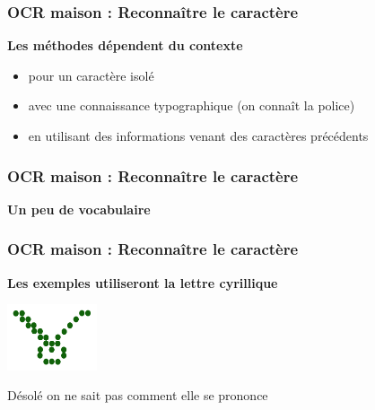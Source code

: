 \documentclass[xcolor=dvipsnames]{beamer}
\begin{document}
\begin{frame}
\frametitle{OCR maison : Reconnaître le caractère }
      \begin{alertblock}{}
            \begin{center}
                  \textbf{\Large Les méthodes dépendent du contexte}
            \end{center}
            \begin{itemize}
            \item pour un caractère isolé
            \item avec une connaissance typographique (on connaît la police)
            \item en utilisant des informations venant des caractères précédents
            \end{itemize}
      \end{alertblock}
\end{frame}


\begin{frame}
\frametitle{OCR maison : Reconnaître le caractère }
       
      \begin{alertblock}{}
            \begin{center}
                  \textbf{\Large Un peu de vocabulaire}
            \end{center}
      \end{alertblock}
\end{frame}

\begin{frame}
\frametitle{OCR maison : Reconnaître le caractère }
      \begin{alertblock}{}
    \begin{center}
              \textbf{\Large Les exemples utiliseront la lettre cyrillique}
    \end{center}
      \end{alertblock}
    \begin{center}
       \pause
       \includegraphics[width=100px]{chmoll.png}
    \end{center}
      \pause Désolé on ne sait pas comment elle se prononce
\end{frame}
\end{document}

